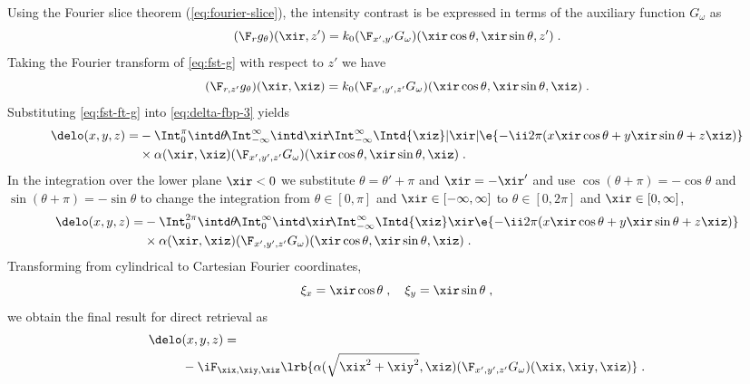 \documentclass[
twoside,
openright,
titlepage,
numbers=noenddot,
headinclude,
fleqn,
a4paper,
footinclude=true,
cleardoublepage=empty,
abstractoff,
BCOR=5mm,
paper=a4,
fontsize=11pt,
british,ngerman,american,
]{scrreprt}
\begin{document}
Using the Fourier slice theorem  (\cref{eq:fourier-slice}), the
intensity contrast is be expressed in terms of the auxiliary function
$G_\omega$ as
\begin{equation}
  \label{eq:fst-g}
  (\F_r g_\theta)(\xir,z') = k_0
  (\F_{x',y'}G_\omega)(\xir\cos\theta,\xir\sin\theta,z') \;.
\end{equation}
Taking the Fourier transform of \cref{eq:fst-g} with respect to $z'$
we have
\begin{equation}
  \label{eq:fst-ft-g}
  (\F_{r,z'}g_\theta)(\xir,\xiz) = k_0
  (\F_{x',y',z'}G_\omega)(\xir\cos\theta,\xir\sin\theta,\xiz) \;.
\end{equation}
Substituting \cref{eq:fst-ft-g} into \cref{eq:delta-fbp-3} yields
\begin{equation}
  \label{eq:delta-fbp-4}
  \begin{split}
    \delo(x,y,z)=&
     -\Int_0^{\pi}\intd\theta\!
    \Int_{-\infty}^\infty\intd\xir\!
    \Int_{-\infty}^\infty\Intd{\xiz} |\xir|
    \e{-\ii 2\pi(x\xir\cos\theta+y\xir\sin\theta+z\xiz)}    
    \\ & \times\alpha(\xir,\xiz)
    (\F_{x',y',z'}G_\omega)(\xir\cos\theta,\xir\sin\theta,\xiz) \;.
  \end{split}
\end{equation}
In the integration over the lower plane $\xir<0$ we substitute
$\theta=\theta'+\pi$ and $\xir=-\xir'$ and use
$\cos(\theta+\pi)=-\cos\theta$ and $\sin(\theta+\pi)=-\sin\theta$ to
change the integration from $\theta\in[0,\pi]$ and
$\xir\in[-\infty,\infty]$ to $\theta\in[0,2\pi]$ and
$\xir\in[0,\infty]$,
\begin{equation}
  \label{eq:delta-fbp-5}
  \begin{split}
    \delo(x,y,z)=&
     -\Int_0^{2\pi}\intd\theta\!
    \Int_0^\infty\intd\xir\!
    \Int_{-\infty}^\infty\Intd{\xiz} \xir
    \e{-\ii 2\pi(x\xir\cos\theta+y\xir\sin\theta+z\xiz)}    
    \\ & \times\alpha(\xir,\xiz)
    (\F_{x',y',z'}G_\omega)(\xir\cos\theta,\xir\sin\theta,\xiz) \;.
  \end{split}
\end{equation}
Transforming from cylindrical to Cartesian Fourier coordinates,
\begin{equation}
  \label{eq:cylindrical}
   \xi_x= \xir \cos\theta \;,\quad \xi_y = \xir \sin\theta \;,
\end{equation}
we obtain the final result for direct retrieval as
\begin{equation}
  \label{eq:direct-retrieval}
  \begin{split}
    \delo&(x,y,z) = 
    \\ &-\iF_{\xix,\xiy,\xiz}\lrb{
     \alpha(\sqrt{\xix^2+\xiy^2},\xiz)
    (\F_{x',y',z'}G_\omega)(\xix,\xiy,\xiz) } \;.
  \end{split}
\end{equation}
\end{document}
